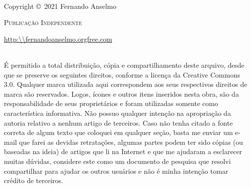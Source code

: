 \documentclass[a4paper,11pt]{book} %
\begin{document}
\begingroup
\thispagestyle{empty}
\vfill
\endgroup

\newpage
~\vfill
\thispagestyle{empty}

\noindent Copyright \copyright\ 2021 Fernando Anselmo%

\noindent \textsc{Publicação Independente} %

\noindent \url{http:\\fernandoanselmo.orgfree.com} %

\noindent \\ É permitido a total distribuição, cópia e compartilhamento deste arquivo, desde que se preserve os seguintes direitos, conforme a licença da Creative Commons 3.0. Qualquer marca utilizada aqui correspondem aos seus respectivos direitos de marca são reservados. Logos, ícones e outros itens inseridos nesta obra, são da responsabilidade de seus proprietários e foram utilizadas somente como característica informativa. Não possuo qualquer intenção na apropriação da autoria relativo a nenhum artigo de terceiros. Caso não tenha citado a fonte correta de algum texto que coloquei em qualquer seção, basta me enviar um e-mail que farei as devidas retratações, algumas partes podem ter sido cópias (ou baseadas na ideia) de artigos que li na Internet e que me ajudaram a esclarecer muitas dúvidas, considere este como um documento de pesquisa que resolvi compartilhar para ajudar os outros usuários e não é minha intenção tomar crédito de terceiros. %

\end{document}
